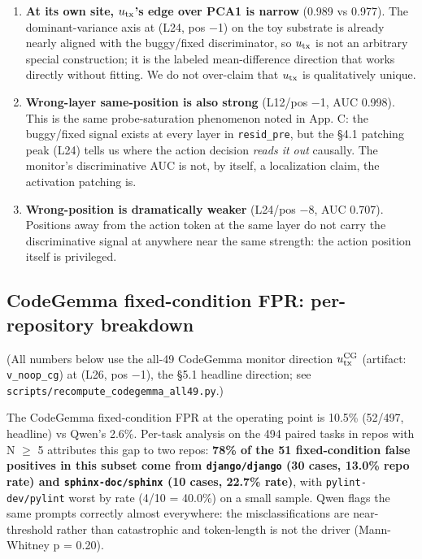 \documentclass[
  11pt,
  a4paper]{article}
\providecommand{\tightlist}{%
  \setlength{\itemsep}{0pt}\setlength{\parskip}{0pt}}
\begin{document}
\begin{enumerate}
\def\labelenumi{\arabic{enumi}.}
\tightlist
\item
  \textbf{At its own site, \(u_{\rm tx}\)'s edge over PCA1 is narrow}
  (0.989 vs 0.977). The dominant-variance axis at (L24, pos \ensuremath{-}1) on the
  toy substrate is already nearly aligned with the buggy/fixed
  discriminator, so \(u_{\rm tx}\) is not an arbitrary special
  construction; it is the labeled mean-difference direction that works
  directly without fitting. We do not over-claim that \(u_{\rm tx}\) is
  qualitatively unique.
\item
  \textbf{Wrong-layer same-position is also strong} (L12/pos \ensuremath{-}1, AUC
  0.998). This is the same probe-saturation phenomenon noted in App. C:
  the buggy/fixed signal exists at every layer in \texttt{resid\_pre},
  but the \S{}4.1 patching peak (L24) tells us where the action decision
  \emph{reads it out} causally. The monitor's discriminative AUC is not,
  by itself, a localization claim, the activation patching is.
\item
  \textbf{Wrong-position is dramatically weaker} (L24/pos \ensuremath{-}8, AUC
  0.707). Positions away from the action token at the same layer do not
  carry the discriminative signal at anywhere near the same strength:
  the action position itself is privileged.
\end{enumerate}

\subsection{CodeGemma fixed-condition FPR: per-repository
breakdown}\label{codegemma-fixed-condition-fpr-per-repository-breakdown}

(All numbers below use the all-49 CodeGemma monitor direction
\(u_{\rm tx}^{\rm CG}\) (artifact: \texttt{v\_noop\_cg}) at (L26, pos
\ensuremath{-}1), the \S{}5.1 headline direction; see
\texttt{scripts/recompute\_codegemma\_all49.py}.)

The CodeGemma fixed-condition FPR at the operating point is 10.5\%
(52/497, headline) vs Qwen's 2.6\%. Per-task analysis on the 494 paired
tasks in repos with N \ensuremath{\geq} 5 attributes this gap to two repos: \textbf{78\%
of the 51 fixed-condition false positives in this subset come from
\texttt{django/django} (30 cases, 13.0\% repo rate) and
\texttt{sphinx-doc/sphinx} (10 cases, 22.7\% rate)}, with
\texttt{pylint-dev/pylint} worst by rate (4/10 = 40.0\%) on a small
sample. Qwen flags the same prompts correctly almost everywhere: the
misclassifications are near-threshold rather than catastrophic and
token-length is not the driver (Mann-Whitney p = 0.20).
\end{document}
